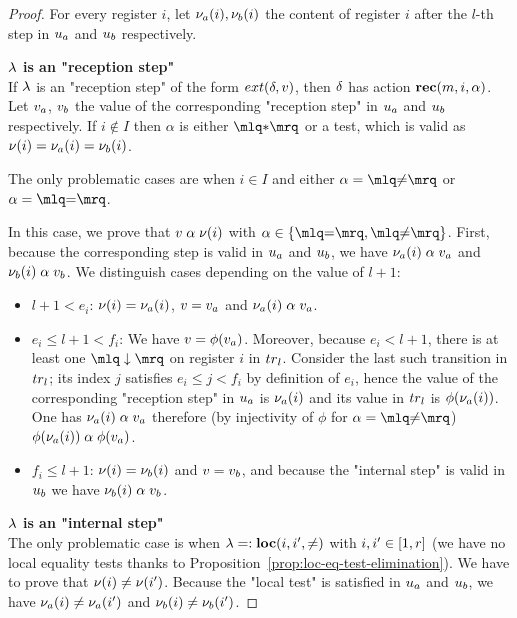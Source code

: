 \begin{proof}
	For every register $i$, let $\nu_a(i), \nu_b(i)$ the content of register $i$ after the $l$-th step in $u_a$ and $u_b$ respectively.
	
	\noindent \textbf{$\lambda$ is an "reception step"} \\
	If $\lambda$ is an "reception step" of the form $\extlabel{\atrans}{\aval}$, then $\delta$ has action $\textbf{rec}(m, i, \alpha)$. Let $v_a$, $v_b$ the value of the corresponding "reception step" in $u_a$ and $u_b$ respectively. If $i \notin I$ then $\alpha$ is either $\quotemarks{\dummyact}$ or a test, which is valid as  $\nu(i) = \nu_a(i) = \nu_b(i)$.
	
	The only problematic cases are when $i \in I$ and either $\anact = \quotemarks{\diseqtestact}$ or $\anact = \quotemarks{\eqtestact}$. 
	
	In this case, we prove that $v \mathrel{\alpha} \nu(i)$ with $\anact \in \set{\quotemarks{\eqtestact}, \quotemarks{\diseqtestact}}$. First, because the corresponding step is valid in $u_a$ and $u_b$, we have $\nu_a(i) \mathrel{\alpha} v_a$ and $\nu_b(i) \mathrel{\alpha} v_b$. We distinguish cases depending on the value of $l+1$:
	\begin{itemize}
		\item $l+1<e_i$: $\nu(i)= \nu_a(i)$, $v = v_a$ and $\nu_a(i) \mathrel{\alpha} v_a$. 
		\item $e_i \leq l+1 < f_i$: We have $v = \phi(v_a)$. 
		Moreover, because $e_i < l+1$, there is at least one $\quotemarks{\enregact}$ on register $i$ in $\atrace_l$. Consider the last such transition in $\atrace_l$; its index $j$ satisfies $e_i \leq j < f_i$ by definition of $e_i$, hence the value of the corresponding "reception step" in $u_a$ is $\nu_a(i)$ and its value in $\atrace_{l}$ is $\phi(\nu_a(i))$. One has $\nu_a(i) \mathrel{\alpha} v_a$ therefore (by injectivity of $\phi$ for $\anact = \quotemarks{\diseqtestact}$)
		$\phi(\nu_a(i)) \mathrel{\alpha} \phi(v_a)$.
		\item$f_i \leq l+1$: $\nu(i)= \nu_b(i)$ and $v = v_b$, and because the "internal step" is valid in $u_b$ we have $\nu_b(i) \mathrel{\alpha} v_b$. 
	\end{itemize}
	
	\noindent \textbf{$\lambda$ is an "internal step"} \\
	The only problematic case is when $\lambda =: \textbf{loc}(i,i',{\ne})$ with $i,i' \in [1,r]$ (we have no local equality tests thanks to Proposition~\ref{prop:loc-eq-test-elimination}). We have to prove that $\nu(i) \ne \nu(i')$. 
	Because the "local test" is satisfied in $u_a$ and $u_b$, we have $\nu_a(i) \ne \nu_a(i')$ and $\nu_b(i) \ne \nu_b(i')$.
	

\end{proof}
